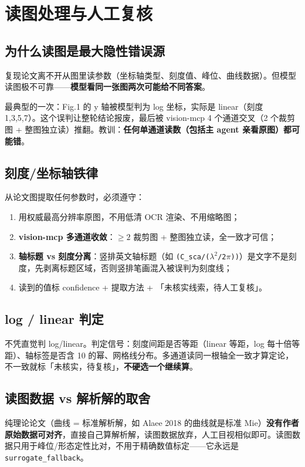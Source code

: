 \section{读图处理与人工复核}

\subsection{为什么读图是最大隐性错误源}

复现论文离不开从图里读参数（坐标轴类型、刻度值、峰位、曲线数据）。但模型读图极不可靠——\textbf{模型看同一张图两次可能给不同答案}。

\begin{lesson}
最典型的一次：Fig.1 的 y 轴被模型判为 log 坐标，实际是 linear（刻度 1,3,5,7）。这个误判让整轮结论报废，最后被 vision-mcp 4 个通道交叉（2 个裁剪图 + 整图独立读）推翻。教训：\textbf{任何单通道读数（包括主 agent 亲看原图）都可能错}。
\end{lesson}

\subsection{刻度/坐标轴铁律}

从论文图提取任何参数时，必须遵守：

\begin{enumerate}
  \item 用权威最高分辨率原图，不用低清 OCR 渲染、不用缩略图；
  \item \textbf{vision-mcp 多通道收敛}：$\ge2$ 裁剪图 + 整图独立读，全一致才可信；
  \item \textbf{轴标题 vs 刻度分离}：竖排英文轴标题（如 \texttt{(C\_sca/(}$\lambda^2$\texttt{/2}$\pi$\texttt{))}）是文字不是刻度，先剥离标题区域，否则竖排笔画混入被误判为刻度线；
  \item 读到的值标 confidence + 提取方法 + 「未核实线索，待人工复核」。
\end{enumerate}

\subsection{log / linear 判定}

不凭直觉判 log/linear。判定信号：刻度间距是否等距（linear 等距，log 每十倍等距）、轴标签是否含 10 的幂、网格线分布。多通道读同一根轴全一致才算定论，不一致就标「未核实，待复核」，\textbf{不硬选一个继续算}。

\subsection{读图数据 vs 解析解的取舍}

纯理论论文（曲线 = 标准解析解，如 Alaee 2018 的曲线就是标准 Mie）\textbf{没有作者原始数据可对齐}，直接自己算解析解，读图数据放弃，人工目视相似即可。读图数据只用于峰位/形态定性比对，不用于精确数值标定——它永远是 \texttt{surrogate\_fallback}。
